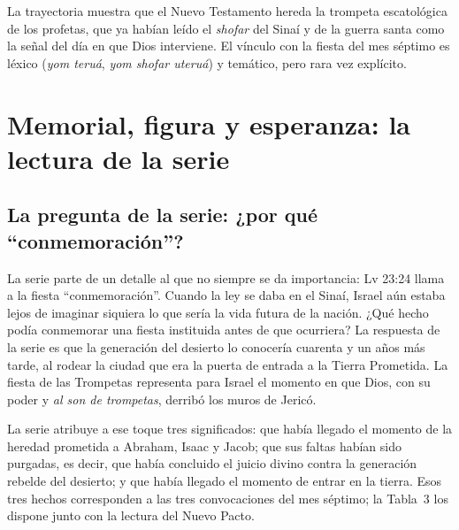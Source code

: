 \documentclass[11pt,letterpaper]{article}
\begin{document}
La trayectoria muestra que el Nuevo Testamento hereda la trompeta escatológica de los profetas, que ya habían leído el \emph{shofar} del Sinaí y de la guerra santa como la señal del día en que Dios interviene. El vínculo con la fiesta del mes séptimo es léxico (\emph{yom teruá}, \emph{yom shofar uteruá}) y temático, pero rara vez explícito.

\section{Memorial, figura y esperanza: la lectura de la serie}

\subsection{La pregunta de la serie: ¿por qué ``conmemoración''?}
La serie parte de un detalle al que no siempre se da importancia: Lv 23:24 llama a la fiesta ``conmemoración''. Cuando la ley se daba en el Sinaí, Israel aún estaba lejos de imaginar siquiera lo que sería la vida futura de la nación. ¿Qué hecho podía conmemorar una fiesta instituida antes de que ocurriera? La respuesta de la serie es que la generación del desierto lo conocería cuarenta y un años más tarde, al rodear la ciudad que era la puerta de entrada a la Tierra Prometida. La fiesta de las Trompetas representa para Israel el momento en que Dios, con su poder y \emph{al son de trompetas}, derribó los muros de Jericó.

La serie atribuye a ese toque tres significados: que había llegado el momento de la heredad prometida a Abraham, Isaac y Jacob; que sus faltas habían sido purgadas, es decir, que había concluido el juicio divino contra la generación rebelde del desierto; y que había llegado el momento de entrar en la tierra. Esos tres hechos corresponden a las tres convocaciones del mes séptimo; la Tabla~3 los dispone junto con la lectura del Nuevo Pacto.
\end{document}
